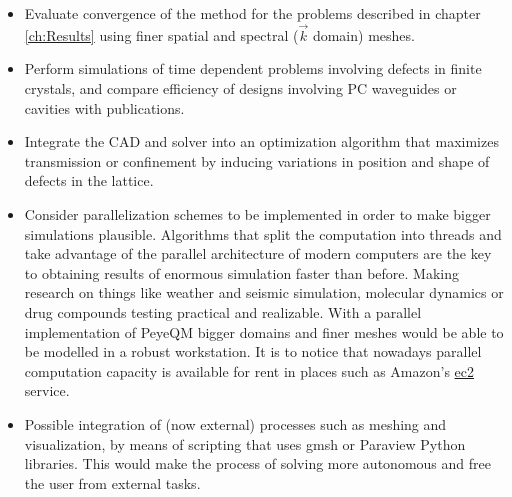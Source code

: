 \begin{itemize}
%
\item Evaluate convergence of the method for the problems described in chapter \ref{ch:Results} using finer spatial and spectral ($\vec{k}$ domain) meshes.
%
\item Perform simulations of time dependent problems involving defects in finite crystals, and compare efficiency of designs involving PC waveguides or cavities with publications.
%
\item Integrate the CAD and solver into an optimization algorithm that maximizes transmission or confinement by inducing variations in position and shape of defects in the lattice.
%
\item Consider parallelization schemes to be implemented in order to make bigger simulations plausible. Algorithms that split the computation into threads and take advantage of the parallel architecture of modern computers are the key to obtaining results of enormous simulation faster than before. Making research on things like weather and seismic simulation, molecular dynamics or drug compounds testing practical and realizable. With a parallel implementation of PeyeQM bigger domains and finer meshes would be able to be modelled in a robust workstation. It is to notice that nowadays parallel computation capacity is available for rent in places such as Amazon's \href{http://aws.amazon.com/ec2/}{ec2} service.
\item Possible integration of (now external) processes such as meshing and visualization, by means of scripting that uses gmsh or Paraview Python libraries. This would make the process of solving more autonomous and free the user from external tasks.
\end{itemize}


